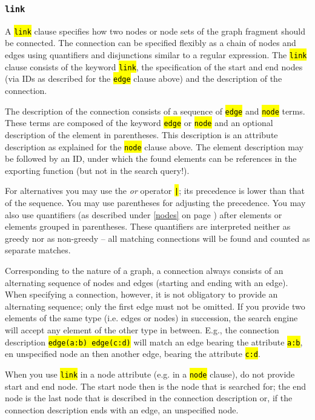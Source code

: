 \documentclass[12pt]{scrartcl}
\newcommand{\code}[1]{\hl{\texttt{#1}}}
\begin{document}
\subsubsection{\texttt{link}}\label{link}

A \code{link} clause specifies how two nodes or node sets of the graph fragment should be connected.
The connection can be specified flexibly as a chain of nodes and edges using quantifiers and disjunctions similar to a regular expression.
The \code{link} clause consists of the keyword \code{link}, the specification of the start and end nodes (via IDs as described for the \code{edge} clause above) and the description of the connection.

The description of the connection consists of a sequence of \code{edge} and \code{node} terms.
These terms are composed of the keyword \code{edge} or \code{node} and an optional description of the element in parentheses.
This description is an attribute description as explained for the \code{node} clause above.
The element description may be followed by an ID, under which the found elements can be references in the exporting function (but not in the search query!).

For alternatives you may use the \textit{or} operator \code{|}; its precedence is lower than that of the sequence.
You may use parentheses for adjusting the precedence.
You may also use quantifiers (as described under \ref{nodes} on page \pageref{quantifiers}) after elements or elements grouped in parentheses.
These quantifiers are interpreted neither as greedy nor as non-greedy – all matching connections will be found and counted as separate matches.

Corresponding to the nature of a graph, a connection always consists of an alternating sequence of nodes and edges (starting and ending with an edge).
When specifying a connection, however, it is not obligatory to provide an alternating sequence; only the first edge must not be omitted.
If you provide two elements of the same type (i.e. edges or nodes) in succession, the search engine will accept any element of the other type in between.
E.g., the connection description \code{edge(a:b) edge(c:d)} will match an edge bearing the attribute \code{a:b}, en unspecified node an then another edge, bearing the attribute \code{c:d}.

When you use \code{link} in a node attribute (e.g. in a \code{node} clause), do not provide start and end node.
The start node then is the node that is searched for; the end node is the last node that is described in the connection description or, if the connection description ends with an edge, an unspecified node.
\end{document}
